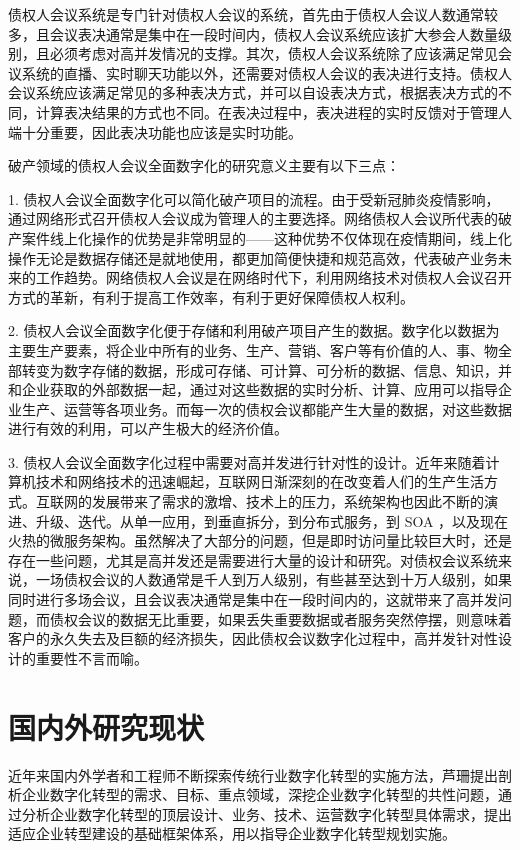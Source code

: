 债权人会议系统是专门针对债权人会议的系统，首先由于债权人会议人数通常较多，且会议表决通常是集中在一段时间内，债权人会议系统应该扩大参会人数量级别，且必须考虑对高并发情况的支撑。其次，债权人会议系统除了应该满足常见会议系统的直播、实时聊天功能以外，还需要对债权人会议的表决进行支持。债权人会议系统应该满足常见的多种表决方式，并可以自设表决方式，根据表决方式的不同，计算表决结果的方式也不同。在表决过程中，表决进程的实时反馈对于管理人端十分重要，因此表决功能也应该是实时功能。

破产领域的债权人会议全面数字化的研究意义主要有以下三点：

1. 债权人会议全面数字化可以简化破产项目的流程。由于受新冠肺炎疫情影响，通过网络形式召开债权人会议成为管理人的主要选择。网络债权人会议所代表的破产案件线上化操作的优势是非常明显的——这种优势不仅体现在疫情期间，线上化操作无论是数据存储还是就地使用，都更加简便快捷和规范高效，代表破产业务未来的工作趋势。网络债权人会议是在网络时代下，利用网络技术对债权人会议召开方式的革新，有利于提高工作效率，有利于更好保障债权人权利。

2. 债权人会议全面数字化便于存储和利用破产项目产生的数据。数字化以数据为主要生产要素，将企业中所有的业务、生产、营销、客户等有价值的人、事、物全部转变为数字存储的数据，形成可存储、可计算、可分析的数据、信息、知识，并和企业获取的外部数据一起，通过对这些数据的实时分析、计算、应用可以指导企业生产、运营等各项业务。而每一次的债权会议都能产生大量的数据，对这些数据进行有效的利用，可以产生极大的经济价值。

3. 债权人会议全面数字化过程中需要对高并发进行针对性的设计。近年来随着计算机技术和网络技术的迅速崛起，互联网日渐深刻的在改变着人们的生产生活方式。互联网的发展带来了需求的激增、技术上的压力，系统架构也因此不断的演进、升级、迭代。从单一应用，到垂直拆分，到分布式服务，到 SOA ，以及现在火热的微服务架构。虽然解决了大部分的问题，但是即时访问量比较巨大时，还是存在一些问题，尤其是高并发还是需要进行大量的设计和研究。对债权会议系统来说，一场债权会议的人数通常是千人到万人级别，有些甚至达到十万人级别，如果同时进行多场会议，且会议表决通常是集中在一段时间内的，这就带来了高并发问题，而债权会议的数据无比重要，如果丢失重要数据或者服务突然停摆，则意味着客户的永久失去及巨额的经济损失，因此债权会议数字化过程中，高并发针对性设计的重要性不言而喻。

\section{国内外研究现状}
近年来国内外学者和工程师不断探索传统行业数字化转型的实施方法，芦珊\cite{Li1999}提出剖析企业数字化转型的需求、目标、重点领域，深挖企业数字化转型的共性问题，通过分析企业数字化转型的顶层设计、业务、技术、运营数字化转型具体需求，提出适应企业转型建设的基础框架体系，用以指导企业数字化转型规划实施。

